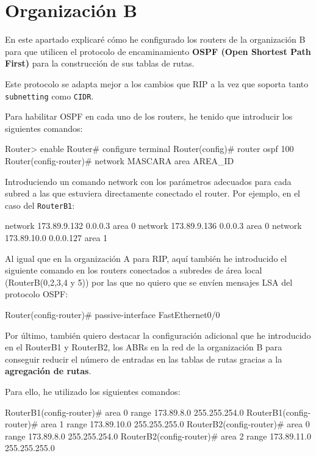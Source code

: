 \section{Organización B}
\par En este apartado explicaré cómo he configurado los routers de la organización B para que utilicen el protocolo de encaminamiento \textbf{OSPF (Open Shortest Path First)} para la construcción de sus tablas de rutas.
\par Este protocolo se adapta mejor a los cambios que RIP a la vez que soporta tanto \texttt{subnetting} como \texttt{CIDR}.
\par Para habilitar OSPF en cada uno de los routers, he tenido que introducir los siguientes comandos:
\begin{listing}[style=consola]
Router> enable
Router# configure terminal
Router(config)# router ospf 100
Router(config-router)# network MASCARA area AREA_ID
\end{listing}
\par Introduciendo un comando network con los parámetros adecuados para cada subred a las que estuviera directamente conectado el router. Por ejemplo, en el caso del \texttt{RouterB1}:
\begin{listing}[style=consola]
network 173.89.9.132 0.0.0.3 area 0
network 173.89.9.136 0.0.0.3 area 0
network 173.89.10.0 0.0.0.127 area 1
\end{listing}
\par Al igual que en la organización A para RIP, aquí también he introducido el siguiente comando en los routers conectados a subredes de área local (RouterB(0,2,3,4 y 5)) por las que no quiero que se envíen mensajes LSA del protocolo OSPF:
\begin{listing}[style=consola]
Router(config-router)# passive-interface FastEthernet0/0
\end{listing}
\par Por último, también quiero destacar la configuración adicional que he introducido en el RouterB1 y RouterB2, los ABRs en la red de la organización B para conseguir reducir el número de entradas en las tablas de rutas gracias a la \textbf{agregación de rutas}.
\par Para ello, he utilizado los siguientes comandos:
\begin{listing}[style=consola]
RouterB1(config-router)# area 0 range 173.89.8.0 255.255.254.0
RouterB1(config-router)# area 1 range 173.89.10.0 255.255.255.0
RouterB2(config-router)# area 0 range 173.89.8.0 255.255.254.0
RouterB2(config-router)# area 2 range 173.89.11.0 255.255.255.0
\end{listing}
